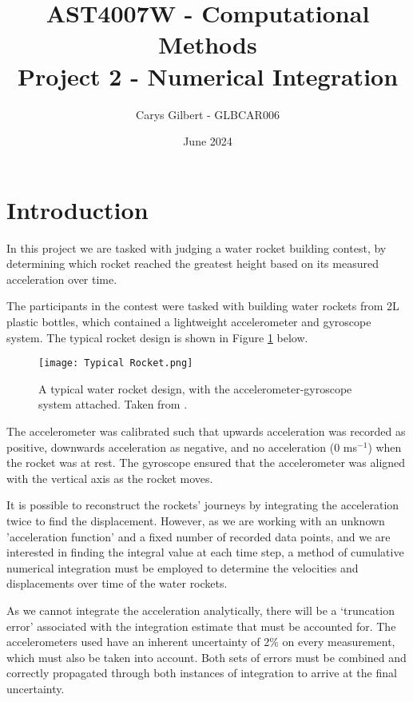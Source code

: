 \documentclass{article}
\begin{document}
\title{AST4007W - Computational Methods \\ Project 2 - Numerical Integration}
\author{Carys Gilbert - GLBCAR006}
\date{June 2024}

\maketitle


\section*{Introduction}

    In this project we are tasked with judging a water rocket building contest, by determining which rocket reached the greatest height based on its measured acceleration over time.
    
    The participants in the contest were tasked with building water rockets from 2L plastic bottles, which contained a lightweight accelerometer and gyroscope system. The typical rocket design is shown in Figure \ref{fig:typical-rocket} below. 

    
    \begin{figure}[H]
        \centering
        \texttt{[image: Typical Rocket.png]}
        \caption{A typical water rocket design, with the accelerometer-gyroscope system attached. Taken from \cite{project2_manual}.}
        \label{fig:typical-rocket}
    \end{figure}
        
    The accelerometer was calibrated such that upwards acceleration was recorded as positive, downwards acceleration as negative, and no acceleration (0 ms$^{-1}$) when the rocket was at rest. The gyroscope ensured that the accelerometer was aligned with the vertical axis as the rocket moves.

    It is possible to reconstruct the rockets' journeys by integrating the acceleration twice to find the displacement. However, as we are working with an unknown 'acceleration function' and a fixed number of recorded data points, and we are interested in finding the integral value at each time step, a method of cumulative numerical integration must be employed to determine the velocities and displacements over time of the water rockets. 
    
    As we cannot integrate the acceleration analytically, there will be a `truncation error' associated with the integration estimate that must be accounted for. The accelerometers used have an inherent uncertainty of 2\% on every measurement, which must also be taken into account. Both sets of errors must be combined and correctly propagated through both instances of integration to arrive at the final uncertainty.  
    
\end{document}
